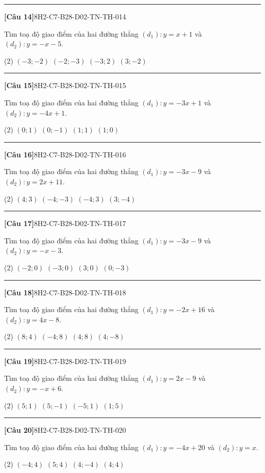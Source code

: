 \documentclass[12pt,a4paper]{article}
\newif\ifloigiai
\newenvironment{cauhoi}[2]{%
  \par\medskip\noindent\rule{\textwidth}{0.4pt}\par\nopagebreak
  \noindent\textbf{[#1]}\hfill{\scriptsize\ttfamily #2}\par\nopagebreak\smallskip}{\par}
\newcommand{\dapan}[1]{\ifloigiai\par\smallskip\noindent\textit{Đáp án:} \textbf{#1}\par\fi}
\begin{document}
\begin{cauhoi}{Câu 14}{8H2-C7-B28-D02-TN-TH-014}
Tìm toạ độ giao điểm của hai đường thẳng $(d_1): y=x+1$ và $(d_2): y=-x-5$.
\begin{tasks}(2)
\task $(-3;-2)$
\task $(-2;-3)$
\task $(-3;2)$
\task $(3;-2)$
\end{tasks}
\dapan{A}
\end{cauhoi}
\begin{cauhoi}{Câu 15}{8H2-C7-B28-D02-TN-TH-015}
Tìm toạ độ giao điểm của hai đường thẳng $(d_1): y=-3x+1$ và $(d_2): y=-4x+1$.
\begin{tasks}(2)
\task $(0;1)$
\task $(0;-1)$
\task $(1;1)$
\task $(1;0)$
\end{tasks}
\dapan{A}
\end{cauhoi}
\begin{cauhoi}{Câu 16}{8H2-C7-B28-D02-TN-TH-016}
Tìm toạ độ giao điểm của hai đường thẳng $(d_1): y=-3x-9$ và $(d_2): y=2x+11$.
\begin{tasks}(2)
\task $(4;3)$
\task $(-4;-3)$
\task $(-4;3)$
\task $(3;-4)$
\end{tasks}
\dapan{C}
\end{cauhoi}
\begin{cauhoi}{Câu 17}{8H2-C7-B28-D02-TN-TH-017}
Tìm toạ độ giao điểm của hai đường thẳng $(d_1): y=-3x-9$ và $(d_2): y=-x-3$.
\begin{tasks}(2)
\task $(-2;0)$
\task $(-3;0)$
\task $(3;0)$
\task $(0;-3)$
\end{tasks}
\dapan{B}
\end{cauhoi}
\begin{cauhoi}{Câu 18}{8H2-C7-B28-D02-TN-TH-018}
Tìm toạ độ giao điểm của hai đường thẳng $(d_1): y=-2x+16$ và $(d_2): y=4x-8$.
\begin{tasks}(2)
\task $(8;4)$
\task $(-4;8)$
\task $(4;8)$
\task $(4;-8)$
\end{tasks}
\dapan{C}
\end{cauhoi}
\begin{cauhoi}{Câu 19}{8H2-C7-B28-D02-TN-TH-019}
Tìm toạ độ giao điểm của hai đường thẳng $(d_1): y=2x-9$ và $(d_2): y=-x+6$.
\begin{tasks}(2)
\task $(5;1)$
\task $(5;-1)$
\task $(-5;1)$
\task $(1;5)$
\end{tasks}
\dapan{A}
\end{cauhoi}
\begin{cauhoi}{Câu 20}{8H2-C7-B28-D02-TN-TH-020}
Tìm toạ độ giao điểm của hai đường thẳng $(d_1): y=-4x+20$ và $(d_2): y=x$.
\begin{tasks}(2)
\task $(-4;4)$
\task $(5;4)$
\task $(4;-4)$
\task $(4;4)$
\end{tasks}
\dapan{D}
\end{cauhoi}
\end{document}
